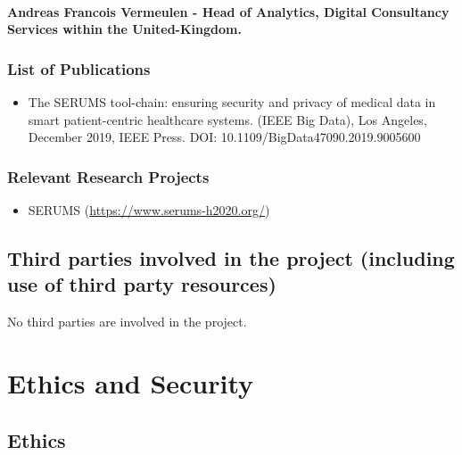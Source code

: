 \documentclass[a4paper,11pt]{article}
\begin{document}
\vspace{10pt}

\paragraph{Andreas Francois Vermeulen - Head of Analytics, Digital Consultancy Services within the United-Kingdom.
}     

\subsubsection*{List of Publications}

\begin{itemize}
\item The SERUMS tool-chain: ensuring security and privacy of medical data in smart patient-centric healthcare systems. (IEEE Big Data), Los Angeles, December 2019, IEEE Press. DOI: 10.1109/BigData47090.2019.9005600
\end{itemize}

\subsubsection*{Relevant Research Projects}
\begin{itemize}
\item SERUMS (\url{https://www.serums-h2020.org/})
\end{itemize}



\subsection{Third parties involved in the project (including use of third party resources)}

No third parties are involved in the project.


\newpage

\section{Ethics and Security}

\subsection{Ethics}
\end{document}
